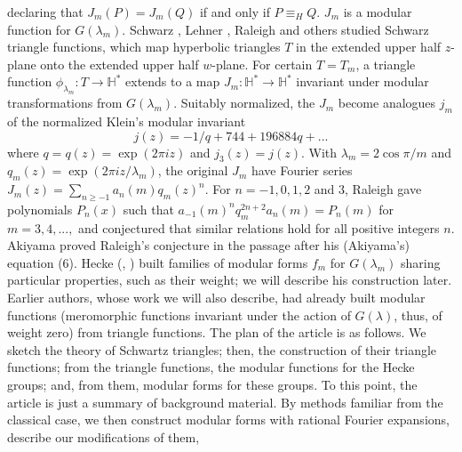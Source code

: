 \documentclass{article}
\begin{document}
declaring that
$J_m(P) = J_m(Q)$
if and only if 
$P \equiv_H Q$.
$J_m$ is a modular function
for $G(\lambda_m)$.
\newline \newline \noindent
Schwarz \cite{schwarz1873ueber}, 
Lehner \cite{lehner1954note},
Raleigh \cite{raleigh1962fourier}
and others
studied Schwarz triangle functions, 
which map  hyperbolic triangles $T$ in the 
 extended upper half $z$-plane  onto
 the extended upper half $w$-plane.
 For certain $T = T_m$, 
a triangle function 
$\phi_{\lambda_m}: T \to \mathbb{H}^*$
 extends to a map
$J_m: \mathbb{H}^* \rightarrow \mathbb{H}^*$
 invariant under
modular transformations
from $G(\lambda_m)$.
Suitably normalized, the $J_m$
become analogues 
$j_m$ of the normalized
Klein's modular invariant 
$$
j(z) = -1/q + 744 + 196884 q + ...
$$
where $q = q(z) = \exp (2 \pi i z)$ 
 and $j_3(z) = j(z)$.
 \newline \newline \noindent
With $\lambda_m = 2 \cos \pi/m$ and 
$q_m(z) = \exp (2 \pi i z/\lambda_m)$,
the original $J_m$ have Fourier series
$J_m(z)= \sum_{n \geq -1} a_n(m) q_m(z)^n$.
For  $n = -1, 0, 1, 2$ and $3$,
Raleigh \cite{raleigh1962fourier}
gave polynomials $P_n(x)$ such that 
$a_{-1}(m)^n q_m^{2n+2} a_n(m) = P_n(m)$
for $m = 3, 4, ...,$
and conjectured that similar 
relations hold for all positive integers
$n$.
Akiyama \cite{akiyama1992note}
proved Raleigh's conjecture
 in the passage 
after his (Akiyama's) equation (6).
\newline  \newline \noindent Hecke 
(\cite{berndt2008hecke}, \cite{hecke1936bestimmung})
built families of modular forms $f_m$
 for $G(\lambda_m)$
sharing particular properties,
such as their weight;
we will describe his construction later.
Earlier authors, whose work we will 
also describe,
had already built modular functions
(meromorphic functions
invariant under the
action of $G(\lambda)$,
thus, of weight zero)
from triangle functions.
\newline \newline \noindent
The plan of the article is as follows.
We sketch 
the theory of Schwartz triangles; then,
the construction of their
triangle functions;
from the triangle functions,
the modular functions
for the Hecke groups;
and, from them,
 modular forms
for these groups.
To this point,
the article is just
a summary of
background
material.
By methods familiar
from the classical case, 
we then construct modular forms
with rational Fourier expansions,
describe our modifications of them,
\end{document}
